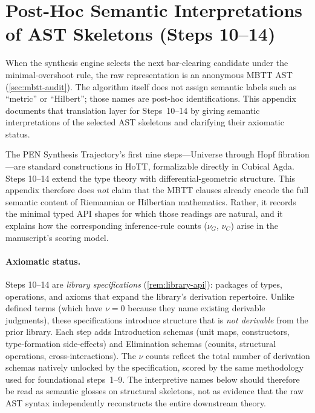 \documentclass[11pt,a4paper]{article}
\theoremstyle{plain}
\theoremstyle{definition}
\theoremstyle{remark}
\begin{document}
\section{Post-Hoc Semantic Interpretations of AST Skeletons (Steps 10--14)}
\label{app:formal-specs}

When the synthesis engine selects the next bar-clearing candidate under the minimal-overshoot rule, the raw representation is an anonymous MBTT AST (\cref{sec:mbtt-audit}).
The algorithm itself does not assign semantic labels such as ``metric'' or ``Hilbert''; those names are post-hoc identifications.
This appendix documents that translation layer for Steps~10--14 by giving semantic interpretations of the selected AST skeletons and clarifying their axiomatic status.

The PEN Synthesis Trajectory's first nine steps---Universe through Hopf fibration---are standard constructions in HoTT, formalizable directly in Cubical Agda.
Steps 10--14 extend the type theory with differential-geometric structure.
This appendix therefore does \emph{not} claim that the MBTT clauses already encode the full semantic content of Riemannian or Hilbertian mathematics.
Rather, it records the minimal typed API shapes for which those readings are natural, and it explains how the corresponding inference-rule counts ($\nu_G$, $\nu_C$) arise in the manuscript's scoring model.

\paragraph{Axiomatic status.}
Steps 10--14 are \emph{library specifications} (\cref{rem:library-api}): packages of types, operations, and axioms that expand the library's derivation repertoire.
Unlike defined terms (which have $\nu = 0$ because they name existing derivable judgments), these specifications introduce structure that is \emph{not derivable} from the prior library.
Each step adds Introduction schemas (unit maps, constructors, type-formation side-effects) and Elimination schemas (counits, structural operations, cross-interactions).
The $\nu$ counts reflect the total number of derivation schemas natively unlocked by the specification, scored by the same methodology used for foundational steps~1--9.
The interpretive names below should therefore be read as semantic glosses on structural skeletons, not as evidence that the raw AST syntax independently reconstructs the entire downstream theory.
\end{document}
